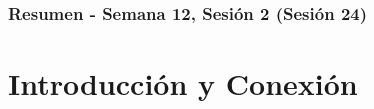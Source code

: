 \documentclass[10pt]{beamer}
\begin{document}
\myfront{}

\begin{frame}
  \titlepage
\end{frame}

\begin{frame}
  \frametitle{Resumen - Semana 12, Sesión 2 (Sesión 24)}
  \tableofcontents
\end{frame}


\section{Introducción y Conexión}
\end{document}
